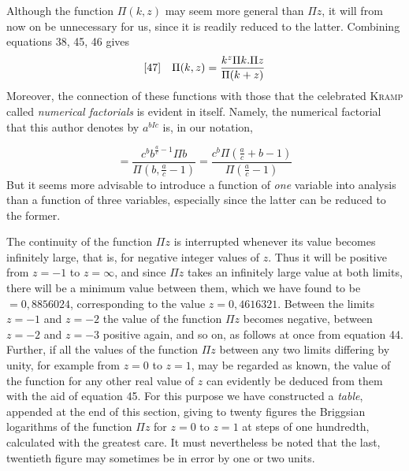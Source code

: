 Although the function $\Pi(k,z)$ may seem more general than $\Pi z$, it will from now on be unnecessary for us, since it is readily reduced to the latter. Combining equations 38, 45, 46 gives
\[
\begin{array}{@{}ll@{}}
[47]&\displaystyle\Pi(k,z)=\frac{k^z\Pi k.\Pi z}{\Pi(k+z)}
\end{array}
\]
Moreover, the connection of these functions with those that the celebrated \textsc{Kramp} called \emph{numerical factorials} is evident in itself. Namely, the numerical factorial that this author denotes by
$a^{bIc}$
is, in our notation,


\[
=\frac{c^b b^{\frac{a}{c}-1}\Pi b}{\Pi(b,\frac{a}{c}-1)}
=\frac{c^b\Pi(\frac{a}{c}+b-1)}{\Pi(\frac{a}{c}-1)}
\]
But it seems more advisable to introduce a function of \emph{one} variable into analysis than a function of three variables, especially since the latter can be reduced to the former.

The continuity of the function $\Pi z$ is interrupted whenever its value becomes infinitely large, that is, for negative integer values of $z$. Thus it will be positive from $z=-1$ to $z=\infty$, and since $\Pi z$ takes an infinitely large value at both limits, there will be a minimum value between them, which we have found to be $=0{,}8856024$, corresponding to the value $z=0{,}4616321$. Between the limits $z=-1$ and $z=-2$ the value of the function $\Pi z$ becomes negative, between $z=-2$ and $z=-3$ positive again, and so on, as follows at once from equation 44. Further, if all the values of the function $\Pi z$ between any two limits differing by unity, for example from $z=0$ to $z=1$, may be regarded as known, the value of the function for any other real value of $z$ can evidently be deduced from them with the aid of equation 45. For this purpose we have constructed a \emph{table}, appended at the end of this section, giving to twenty figures the Briggsian logarithms of the function $\Pi z$ for $z=0$ to $z=1$ at steps of one hundredth, calculated with the greatest care. It must nevertheless be noted that the last, twentieth figure may sometimes be in error by one or two units.

